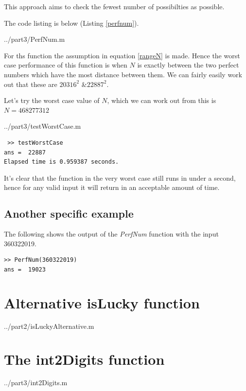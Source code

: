 \documentclass[10pt]{article}
\begin{document}
This approach aims to check the fewest number of possibilties as possible.

The code listing is below (Listing \ref{perfnum}).

  {../part3/PerfNum.m}
 
For ths function the assumption in equation \ref{rangeN} is made. Hence the worst case performance of this function is when $N$ is exactly between the two perfect numbers which have the most distance between them. We can fairly easily work out that these are $20316^2$ \&$22887^2$. 

Let's try the worst case value of $N$, which we can work out from this is $ N = 468277312 $

   {../part3/testWorstCase.m}
  
 \begin{verbatim}
 >> testWorstCase
ans =  22887
Elapsed time is 0.959387 seconds.
\end{verbatim}

It's clear that the function in the very worst case still runs in under a second, hence for any valid input it will return in an acceptable amount of time.

\subsection{Another specific example}

The following shows the output of the \emph{PerfNum} function with the input 360322019.

\begin{verbatim}
>> PerfNum(360322019)
ans =  19023
\end{verbatim}
\begin{appendices}


\section{Alternative isLucky function}\label{islucky_appendix}

   {../part2/isLuckyAlternative.m}
  
\section{The int2Digits function}

   {../part3/int2Digits.m}

\end{appendices}
\end{document}
